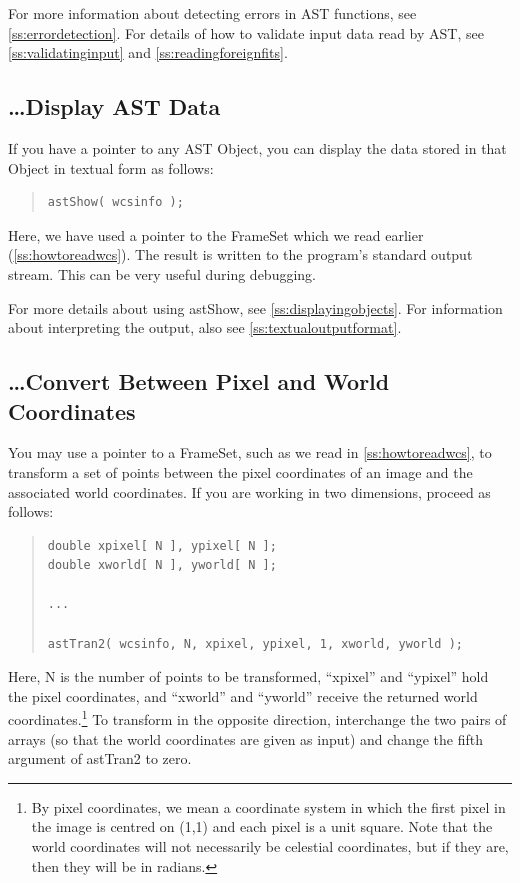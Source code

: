 \documentclass[twoside,11pt]{article}
\newcommand{\htmlref}[2]{#1}
\newcommand{\secref}[1]{\S\ref{#1}}
\renewcommand{\secref}[1]{\ref{#1}}
\begin{document}
For more information about detecting errors in AST functions, see
\secref{ss:errordetection}. For details of how to validate input data
read by AST, see \secref{ss:validatinginput} and
\secref{ss:readingforeignfits}.

\subsection{\ldots Display AST Data}

If you have a pointer to any AST \htmlref{Object}{Object}, you can display the data
stored in that Object in textual form as follows:

\begin{quote}
\small
\begin{verbatim}
astShow( wcsinfo );
\end{verbatim}
\normalsize
\end{quote}

Here, we have used a pointer to the \htmlref{FrameSet}{FrameSet} which we read earlier
(\secref{ss:howtoreadwcs}).  The result is written to the program's
standard output stream. This can be very useful during debugging.

For more details about using \htmlref{astShow}{astShow}, see
\secref{ss:displayingobjects}. For information about interpreting the
output, also see \secref{ss:textualoutputformat}.

\subsection{\label{ss:howtotransform}\ldots Convert Between Pixel and World Coordinates}

You may use a pointer to a \htmlref{FrameSet}{FrameSet}, such as we read in
\secref{ss:howtoreadwcs}, to transform a set of points between the
pixel coordinates of an image and the associated world coordinates. If
you are working in two dimensions, proceed as follows:

\begin{quote}
\small
\begin{verbatim}
double xpixel[ N ], ypixel[ N ];
double xworld[ N ], yworld[ N ];

...

astTran2( wcsinfo, N, xpixel, ypixel, 1, xworld, yworld );
\end{verbatim}
\normalsize
\end{quote}

Here, N is the number of points to be transformed, ``xpixel'' and
``ypixel'' hold the pixel coordinates, and ``xworld'' and ``yworld''
receive the returned world coordinates.\footnote{By pixel coordinates,
we mean a coordinate system in which the first pixel in the image is
centred on (1,1) and each pixel is a unit square.  Note that the world
coordinates will not necessarily be celestial coordinates, but if they
are, then they will be in radians.}  To transform in the opposite
direction, interchange the two pairs of arrays (so that the world
coordinates are given as input) and change the fifth argument of
\htmlref{astTran2}{astTran2} to zero.
\end{document}
